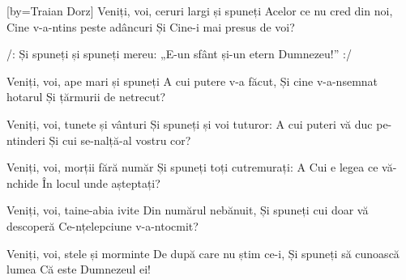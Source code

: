 [by={Traian Dorz}]
\beginverse
Veniți, voi, ceruri largi și spuneți
Acelor ce nu cred din noi,
Cine v-a-ntins peste adâncuri
Și Cine-i mai presus de voi?
\endverse

\beginchorus
/: Și spuneți și spuneți mereu:
„E-un sfânt și-un etern Dumnezeu!” :/
\endchorus

\beginverse
Veniți, voi, ape mari și spuneți
A cui putere v-a făcut,
Și cine v-a-nsemnat hotarul
Și țărmurii de netrecut?
\endverse

\beginverse
Veniți, voi, tunete și vânturi
Și spuneți și voi tuturor:
A cui puteri vă duc pe-ntinderi
Și cui se-nalță-al vostru cor?
\endverse

\beginverse
Veniți, voi, morții fără număr
Și spuneți toți cutremurați:
A Cui e legea ce vă-nchide
În locul unde așteptați?
\endverse

\beginverse
Veniți, voi, taine-abia ivite
Din numărul nebănuit,
Și spuneți cui doar vă descoperă
Ce-nțelepciune v-a-ntocmit?
\endverse

\beginverse
Veniți, voi, stele și morminte
De după care nu știm ce-i,
Și spuneți să cunoască lumea
Că este Dumnezeul ei!
\endverse
\endsong